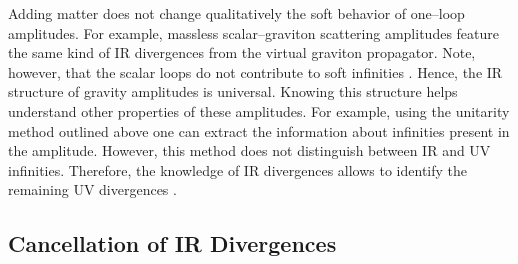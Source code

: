 \documentclass[12pt]{article}
\begin{document}
Adding matter does not change qualitatively the soft behavior of one--loop amplitudes. For example, massless scalar--graviton scattering amplitudes feature the same kind of IR divergences from the virtual graviton propagator. Note, however, that the scalar loops do not contribute to soft infinities \cite{Grisaru:1979re}. Hence, the IR structure of gravity amplitudes is universal. Knowing this structure helps understand other properties of these amplitudes. For example, using the unitarity method outlined above one can extract the information about infinities present in the amplitude. However, this method does not distinguish between IR and UV infinities. Therefore, the knowledge of IR divergences allows to identify the remaining UV divergences \cite{Dunbar:1995ed}.

\subsection{Cancellation of IR Divergences}
\end{document}
